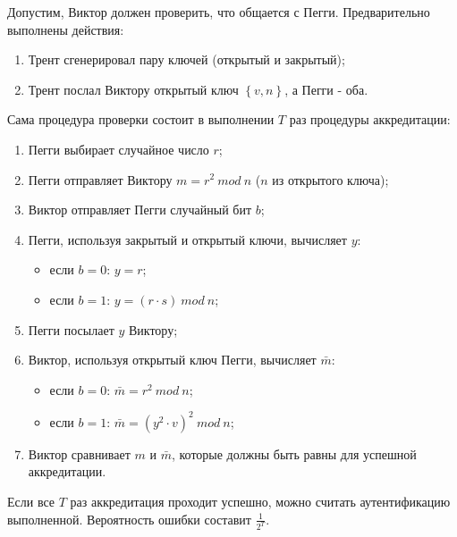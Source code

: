 Допустим, Виктор должен проверить, что общается с Пегги. Предварительно выполнены действия:

\begin{enumerate}
\item Трент сгенерировал пару ключей (открытый и закрытый);
\item Трент послал Виктору открытый ключ $\left\{v, n\right\}$, а Пегги - оба.
\end{enumerate}

Сама процедура проверки состоит в выполнении $T$ раз процедуры аккредитации:

\begin{enumerate}
\item Пегги выбирает случайное число $r$;
\item Пегги отправляет Виктору $m = r ^ 2 \ mod \ n$ ($n$ из открытого ключа);
\item Виктор отправляет Пегги случайный бит $b$;
\item Пегги, используя закрытый и открытый ключи, вычисляет $y$:
    \begin{itemize}
        \item если $b=0$: $y=r$;
        \item если $b=1$: $y= (r \cdot s) \ mod \ n$;
    \end{itemize}
\item Пегги посылает $y$ Виктору;
\item Виктор, используя открытый ключ Пегги, вычисляет $\bar{m}$:
    \begin{itemize}
        \item если $b=0$: $\bar{m}=r^2 \ mod \ n$;
        \item если $b=1$: $\bar{m}=(y^2 \cdot v)^2 \ mod \ n$;
    \end{itemize}
\item Виктор сравнивает $m$ и $\bar{m}$, которые должны быть равны для успешной аккредитации.

\end{enumerate}

Если все $T$ раз аккредитация проходит успешно, можно считать аутентификацию выполненной.
Вероятность ошибки составит $\frac{1}{2^T}$.